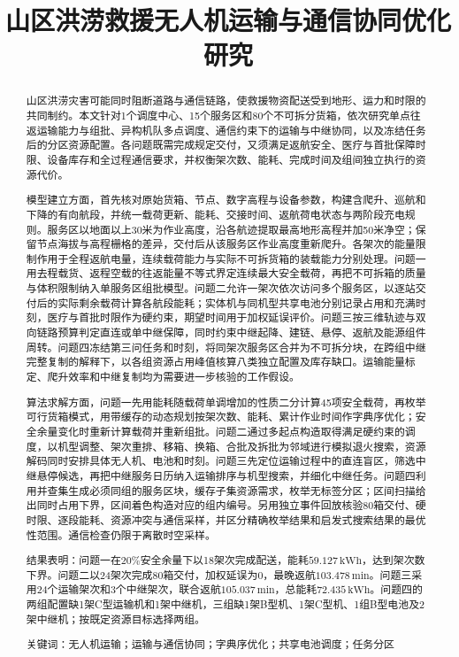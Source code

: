 \documentclass[bwprint]{gmcmthesis}
\title{山区洪涝救援无人机运输与通信协同优化研究}
\begin{document}
\maketitle

\begin{abstract}
山区洪涝灾害可能同时阻断道路与通信链路，使救援物资配送受到地形、运力和时限的共同制约。本文针对1个调度中心、15个服务区和80个不可拆分货箱，依次研究单点往返运输能力与组批、异构机队多点调度、通信约束下的运输与中继协同，以及冻结任务后的分区资源配置。各问题既需完成规定交付，又须满足返航安全、医疗与首批保障时限、设备库存和全过程通信要求，并权衡架次数、能耗、完成时间及组间独立执行的资源代价。

模型建立方面，首先核对原始货箱、节点、数字高程与设备参数，构建含爬升、巡航和下降的有向航段，并统一载荷更新、能耗、交接时间、返航荷电状态与两阶段充电规则。服务区以地面以上30米为作业高度，沿各航迹提取最高地形高程并加50米净空；保留节点海拔与高程栅格的差异，交付后从该服务区作业高度重新爬升。各架次的能量限制作用于全程返航电量，连续载荷能力与实际不可拆货箱的装载能力分别处理。问题一用去程载货、返程空载的往返能量不等式界定连续最大安全载荷，再把不可拆箱的质量与体积限制纳入单服务区组批模型。问题二允许一架次依次访问多个服务区，以逐站交付后的实际剩余载荷计算各航段能耗；实体机与同机型共享电池分别记录占用和充满时刻，医疗与首批时限作为硬约束，期望时间用于加权延误评价。问题三按三维轨迹与双向链路预算判定直连或单中继保障，同时约束中继起降、建链、悬停、返航及能源组件周转。问题四冻结第三问任务和时刻，将同架次服务区合并为不可拆分块，在跨组中继完整复制的解释下，以各组资源占用峰值核算八类独立配置及库存缺口。运输能量标定、爬升效率和中继复制均为需要进一步核验的工作假设。

算法求解方面，问题一先用能耗随载荷单调增加的性质二分计算45项安全载荷，再枚举可行货箱模式，用带缓存的动态规划按架次数、能耗、累计作业时间作字典序优化；安全余量变化时重新计算载荷并重新组批。问题二通过多起点构造取得满足硬约束的调度，以机型调整、架次重排、移箱、换箱、合批及拆批为邻域进行模拟退火搜索，资源解码同时安排具体无人机、电池和时刻。问题三先定位运输过程中的直连盲区，筛选中继悬停候选，再把中继服务日历纳入运输排序与机型搜索，并细化中继任务。问题四利用并查集生成必须同组的服务区块，缓存子集资源需求，枚举无标签分区；区间扫描给出同时占用下界，区间着色构造对应的组内编号。另用独立事件回放核验80箱交付、硬时限、逐段能耗、资源冲突与通信采样，并区分精确枚举结果和启发式搜索结果的最优性范围。通信检查仍限于离散时空采样。

结果表明：问题一在$20\%$安全余量下以18架次完成配送，能耗$59.127\,\mathrm{kWh}$，达到架次数下界。问题二以24架次完成80箱交付，加权延误为0，最晚返航$103.478\,\mathrm{min}$。问题三采用24个运输架次和3个中继架次，联合返航$105.037\,\mathrm{min}$，总能耗$72.435\,\mathrm{kWh}$。问题四的两组配置缺1架C型运输机和1架中继机，三组缺1架B型机、1架C型机、1组B型电池及2架中继机；按既定资源目标选择两组。

\par\vspace{\baselineskip}
\noindent
{\lishu{} 关键词}：无人机运输；运输与通信协同；字典序优化；共享电池调度；任务分区
\end{abstract}
\end{document}
